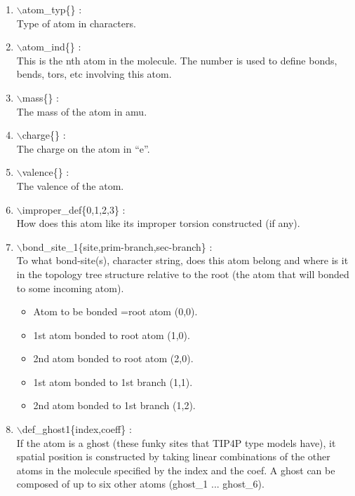 \documentclass[12pt]{article}
\begin{document}
\begin{enumerate}

 \vspace{0.15in} 
 \item  $\backslash$atom\_typ\{\} : \\ 
   Type of atom in characters.
 
 \vspace{0.15in} 
 \item  $\backslash$atom\_ind\{\} : \\ 
   This is the nth atom in the molecule. The number is used to 
   define bonds, bends, tors, etc involving this atom.

 \vspace{0.15in} 
 \item  $\backslash$mass\{\} : \\ 
    The mass of the atom in amu.

 \vspace{0.15in} 
 \item  $\backslash$charge\{\} : \\ 
    The charge on the atom in ``e''.

 \vspace{0.15in} 
 \item  $\backslash$valence\{\} : \\ 
    The valence of the atom.

 \vspace{0.15in} 
 \item  $\backslash$improper\_def\{0,1,2,3\} : \\ 
    How does this atom like its improper torsion constructed (if any).

 \vspace{0.15in} 
 \item  $\backslash$bond\_site\_1\{site,prim-branch,sec-branch\} : \\ 
    To what bond-site(s), character string, does this atom belong and where is
    it in the topology tree structure relative to the root (the atom
    that will bonded to some incoming atom).
      \begin{itemize}
        \item Atom to be bonded =root atom  (0,0).
        \item 1st atom bonded to root atom  (1,0).
        \item 2nd atom bonded to root atom  (2,0).
        \item 1st atom bonded to 1st branch (1,1).
        \item 2nd atom bonded to 1st branch (1,2).
      \end{itemize}


 \vspace{0.15in} 
 \item  $\backslash$def\_ghost1\{index,coeff\} : \\ 
    If the atom is a ghost (these funky sites that TIP4P type
    models have), it spatial position is constructed by taking linear 
    combinations of the other atoms in the molecule specified by the index 
    and the coef. A ghost can be composed of up to six other atoms
    (ghost\_1{} ... ghost\_6{}).

\end{enumerate}
\end{document}
